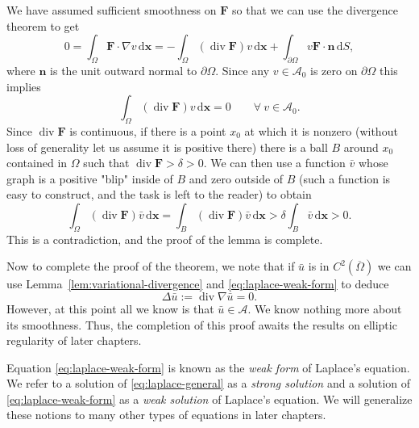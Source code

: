 \begin{Proof}
\begin{Proof}
We have assumed sufficient smoothness on $\bm{F}$ so that we can use the divergence theorem to get
\begin{equation}\label{eq:variational-divergence-theorem}
0=\int_\Omega\bm{F}\cdot\nabla v\,\mathrm{d}\bm{x}=-\int_\Omega(\operatorname{div}\bm{F})v\,\mathrm{d}\bm{x}+\int_{\partial\Omega}v\bm{F}\cdot\bm{n}\,\mathrm{d}S,
\end{equation}
where $\bm{n}$ is the unit outward normal to $\partial\Omega$. Since any $v\in\mathcal{A}_0$ is zero on $\partial\Omega$ this implies
\begin{equation}\label{eq:divergence-test-integral-zero}
\int_\Omega(\operatorname{div}\bm{F})v\,\mathrm{d}\bm{x}=0\qquad\forall\ v\in\mathcal{A}_0.
\end{equation}
Since $\operatorname{div}\bm{F}$ is continuous, if there is a point $x_0$ at which it is nonzero (without loss of generality let us assume it is positive there) there is a ball $B$ around $x_0$ contained in $\Omega$ such that $\operatorname{div}\bm{F}>\delta>0$. We can then use a function $\bar v$ whose graph is a positive "blip" inside of $B$ and zero outside of $B$ (such a function is easy to construct, and the task is left to the reader) to obtain
\begin{equation}\label{eq:positive-test-function-contradiction}
\int_\Omega(\operatorname{div}\bm{F})\bar v\,\mathrm{d}\bm{x}=\int_B(\operatorname{div}\bm{F})\bar v\,\mathrm{d}\bm{x}>\delta\int_B\bar v\,\mathrm{d}\bm{x}>0.
\end{equation}
This is a contradiction, and the proof of the lemma is complete.
\end{Proof}

Now to complete the proof of the theorem, we note that if $\bar u$ is in $C^2(\overline\Omega)$ we can use Lemma~\ref{lem:variational-divergence} and \eqref{eq:laplace-weak-form} to deduce
\begin{equation}\label{eq:minimizer-strong-laplace}
\Delta\bar u:=\operatorname{div}\nabla\bar u=0.
\end{equation}
However, at this point all we know is that $\bar u\in\mathcal{A}$. We know nothing more about its smoothness. Thus, the completion of this proof awaits the results on elliptic regularity of later chapters.\end{Proof}

Equation \eqref{eq:laplace-weak-form} is known as the \emph{weak form} of Laplace's equation. We refer to a solution of \eqref{eq:laplace-general} as a \emph{strong solution} and a solution of \eqref{eq:laplace-weak-form} as a \emph{weak solution} of Laplace's equation. We will generalize these notions to many other types of equations in later chapters.

